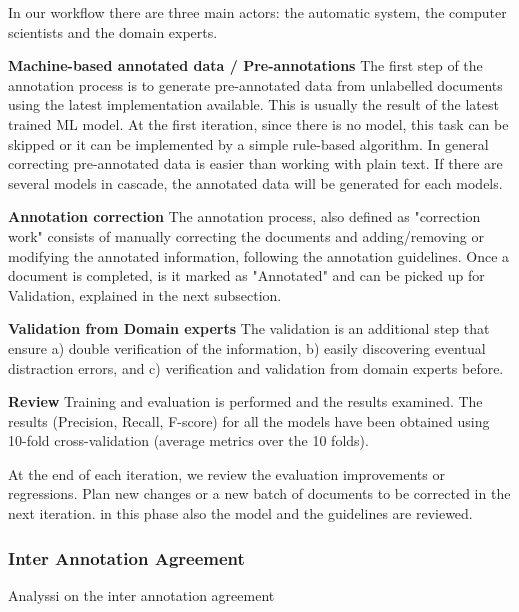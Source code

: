 \documentclass[a4paper,10pt]{article}
\begin{document}
In our workflow there are three main actors: the automatic system, the computer scientists and the domain experts.

\textbf{Machine-based annotated data / Pre-annotations}
The first step of the annotation process is to generate pre-annotated data from unlabelled documents using the latest implementation available. This is usually the result of the latest trained ML model.  
At the first iteration, since there is no model, this task can be skipped or it can be implemented by a simple rule-based algorithm. In general correcting pre-annotated data is easier than working with plain text. 
If there are several models in cascade, the annotated data will be generated for each models.

\textbf{Annotation correction}
The annotation process, also defined as "correction work" consists of manually correcting the documents and adding/removing or modifying the annotated information, following the annotation guidelines. 
Once a document is completed, is it marked as "Annotated" and can be picked up for Validation, explained in the next subsection. 

\textbf{Validation from Domain experts}
The validation is an additional step that ensure a) double verification of the information, b) easily discovering eventual distraction errors, and c) verification and validation from domain experts before. 


\textbf{Review}
Training and evaluation is performed and the results examined. The results (Precision, Recall, F-score) for all the models have been obtained using 10-fold cross-validation (average metrics over the 10 folds).

At the end of each iteration, we review the evaluation improvements or regressions. Plan new changes or a new batch of documents to be corrected in the next iteration. in this phase also the model and the guidelines are reviewed.

\subsubsection{Inter Annotation Agreement}

Analyssi on the inter annotation agreement 
\end{document}
